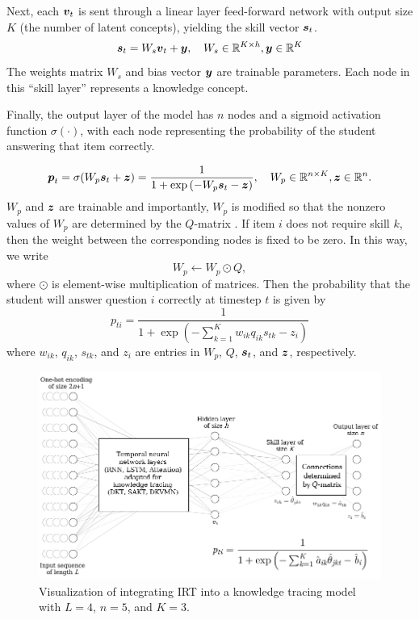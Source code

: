 Next, each $\boldsymbol{v}_t$ is sent through a linear layer feed-forward network with output size $K$ (the number of latent concepts), yielding the skill vector $\boldsymbol{s}_t$.
\begin{equation}
  \boldsymbol{s}_t = W_s \boldsymbol{v}_t + \boldsymbol{y}, \quad W_s \in \mathbb{R}^{K\times h}, \boldsymbol{y} \in \mathbb{R}^K
  \label{eq:skill_layer}
\end{equation}
The weights matrix $W_s$ and bias vector $\boldsymbol{y}$ are trainable parameters. Each node in this ``skill layer'' represents a knowledge concept.

Finally, the output layer of the model has $n$ nodes and a sigmoid activation function $\sigma(\cdot)$, with each node representing the probability of the student answering that item correctly.

\begin{equation}
  \boldsymbol{p}_t = \sigma(W_p \boldsymbol{s}_t + \boldsymbol{z}) = \frac{1}{1 + \exp \left( -W_p \boldsymbol{s}_t - \boldsymbol{z} \right)}, \quad W_p \in \mathbb{R}^{n \times K}, \boldsymbol{z} \in \mathbb{R}^n.
  \label{eq:pred_layer}
\end{equation}
$W_p$ and $\boldsymbol{z}$ are trainable and importantly, $W_p$ is modified so that the nonzero values of $W_p$ are determined by the $Q$-matrix \cite{ijcnn_paper, guo2017}. If item $i$ does not require skill $k$, then the weight between the corresponding nodes is fixed to be zero. In this way, we write
\begin{equation}
  W_p \gets W_p \odot Q,
  \label{eq:weight_constraint}
\end{equation}
where $\odot$ is element-wise multiplication of matrices. Then the probability that the student will answer question $i$ correctly at timestep $t$ is given by 
\begin{equation}
  p_{ti} = \frac{1}{1 + \exp\left( -\sum_{k=1}^K w_{ik} q_{ik} s_{tk} - z_i \right)}
  \label{eq:nn_out}
\end{equation}
where $w_{ik}$, $q_{ik}$, $s_{tk}$, and $z_i$ are entries in $W_p$, $Q$, $\boldsymbol{s}_t$, and $\boldsymbol{z}$, respectively.

\begin{figure}[h]
  \centering
  \includegraphics[width=.95\textwidth]{img/kt_irt/kt_irt_visual_with_equation_2.png}
  \caption{Visualization of integrating IRT into a knowledge tracing model with $L=4$, $n=5$, and $K=3$.}
  \label{fig:kt_irt_visual}
\end{figure}

